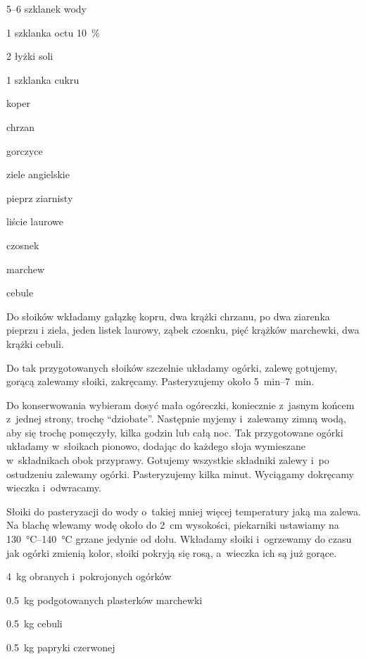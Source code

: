 \documentclass[../main.tex]{subfiles}
\begin{document}

\begin{Ingred}[zalewa]
    \item \numrange{5}{6} szklanek wody
    \item \num{1} szklanka octu \qty{10}{\percent}
    \item \num{2} łyżki soli
    \item \num{1} szklanka cukru
    \item koper
    \item chrzan
    \item gorczyce
    \item ziele angielskie
    \item pieprz ziarnisty
    \item liście laurowe
    \item czosnek
    \item marchew
    \item cebule
\end{Ingred}

Do słoików wkładamy gałązkę kopru, dwa krążki chrzanu, po dwa ziarenka pieprzu
i ziela, jeden listek laurowy, ząbek czosnku, pięć krążków marchewki, dwa
krążki cebuli.

Do tak przygotowanych słoików szczelnie układamy ogórki, zalewę gotujemy,
gorącą zalewamy słoiki, zakręcamy. Pasteryzujemy około
\qtyrange{5}{7}{\minute}.

Do konserwowania wybieram dosyć mała ogóreczki, koniecznie z~jasnym końcem
z~jednej strony, trochę \enquote{dziobate}. Następnie myjemy i~zalewamy zimną
wodą, aby się trochę pomęczyły, kilka godzin lub całą noc. Tak przygotowane
ogórki układamy w~słoikach pionowo, dodając do każdego słoja wymieszane
w~składnikach obok przyprawy. Gotujemy wszystkie składniki zalewy i~po
ostudzeniu zalewamy ogórki. Pasteryzujemy kilka minut. Wyciągamy dokręcamy
wieczka i~odwracamy.

Słoiki do pasteryzacji do wody o~takiej mniej więcej temperatury jaką ma
zalewa. Na blachę wlewamy wodę około do \qty{2}{\centi\metre} wysokości,
piekarniki ustawiamy na \qtyrange{130}{140}{\celsius} grzane jedynie od dołu.
Wkładamy słoiki i~ogrzewamy do czasu jak ogórki zmienią kolor, słoiki pokryją
się rosą, a~wieczka ich są już gorące.


\begin{Ingred}
    \item \qty{4}{\kilo\gram} obranych i~pokrojonych ogórków
    \item \qty{0.5}{\kilo\gram} podgotowanych plasterków marchewki
    \item \qty{0.5}{\kilo\gram} cebuli
    \item \qty{0.5}{\kilo\gram} papryki czerwonej
\end{Ingred}
\end{document}
